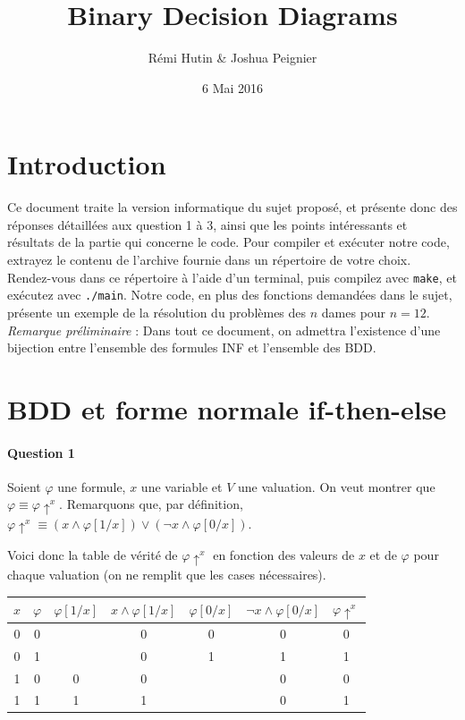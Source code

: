 \documentclass[a4paper,11pt]{article}
\title{Binary Decision Diagrams}
\author{Rémi Hutin \& Joshua Peignier}
\date{6 Mai 2016}
\begin{document}
\maketitle

	\section{Introduction}
	Ce document traite la version informatique du sujet proposé, et présente donc des réponses détaillées aux question 1 à 3, ainsi que les points intéressants et résultats de la partie qui concerne le code.\newline
	Pour compiler et exécuter notre code, extrayez le contenu de l'archive fournie dans un répertoire de votre choix. Rendez-vous dans ce répertoire à l'aide d'un terminal, puis compilez avec \texttt{make}, et exécutez avec \texttt{./main}. Notre code, en plus des fonctions demandées dans le sujet, présente un exemple de la résolution du problèmes des $n$ dames pour $n = 12$.\newline
	\emph{Remarque préliminaire} : Dans tout ce document, on admettra l'existence d'une bijection entre l'ensemble des formules INF et l'ensemble des BDD.
	 
	\section{BDD et forme normale if-then-else}

		\paragraph{Question 1}

		Soient $\varphi$ une formule, $x$ une variable et $V$ une valuation.\newline
On veut montrer que $\varphi \equiv\varphi\uparrow^{x}$.\newline
		Remarquons que, par définition, $\varphi\uparrow^{x} \equiv (x \wedge \varphi[1/x]) \vee (\neg x \wedge \varphi[0/x])$.
		
		Voici donc la table de vérité de $\varphi\uparrow^{x}$ en fonction des valeurs de $x$ et de $\varphi$ pour chaque valuation (on ne remplit que les cases nécessaires).\newline
		
		\begin{tabular}{|c|c|c|c|c|c|c|}
		\hline
		$x$ & $\varphi$ & $\varphi[1/x]$ &  $x \wedge \varphi[1/x]$ & $\varphi[0/x]$ & $\neg x \wedge \varphi[0/x]$ & $\varphi\uparrow^{x}$ \\
		\hline
		0 & 0 &   & 0 & 0 & 0 & 0 \\
		\hline
		0 & 1 &   & 0 & 1 & 1 & 1 \\
		\hline
		1 & 0 & 0 & 0 &   & 0 & 0 \\
		\hline
		1 & 1 & 1 & 1 &   & 0 & 1 \\
		\hline
		\end{tabular}
		
\end{document}
